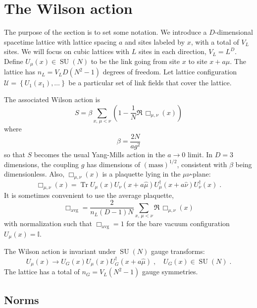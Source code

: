 \documentclass[preprint,aps,prd]{revtex4-2}
\newcommand{\da}{\dagger}  %
\newcommand{\be}{\begin{equation}}
\newcommand{\eq}{\end{equation}}
\newcommand{\plaquette}{\Box}
\newcommand{\config}{\mathcal{U}}
\DeclareMathOperator{\SU}{SU}
\DeclareMathOperator{\Tr}{Tr}
\begin{document}
\section{The Wilson action}

The purpose of the section is to set some notation.
We introduce a $D$-dimensional spacetime lattice with lattice
spacing $a$ and sites labeled by $x$, with a total of $V_L$ sites.
We will focus on cubic lattices with $L$ sites in each direction,
$V_L = L^D$.
Define $U_\mu(x) \in \SU(N)$ to be the link going from site $x$ to
site $x+a \hat{\mu}$.
The lattice has $n_L=V_L D \left(N^2-1\right)$ degrees of freedom.
Let lattice configuration
$\config=\left\{U_1(x_1),\ldots\right\}$
be a particular set of link fields that cover the lattice.

The associated Wilson action is
%
\be
S = \beta \sum_{x,\, \mu<\nu} \left(1-\frac{1}{N} \Re\, \plaquette_{\mu,\nu}(x)\right) \label{action}
\eq
where
\be
\beta=\frac{2 N}{a g^2}
\eq
so that $S$ becomes the usual Yang-Mills action in the $a\to 0$ limit.
In $D=3$ dimensions, the coupling $g$ has dimensions of
$\left(\mbox{mass}\right)^{1/2}$, consistent with $\beta$ being dimensionless.
Also, $\plaquette_{\mu,\nu}(x)$ is a plaquette lying in the $\mu\nu$-plane:
\be
\plaquette_{\mu,\nu}(x) = \Tr U_\mu(x) U_\nu(x+a \hat{\mu})
U_\mu^\da(x+a\hat{\nu}) U_\nu^\da(x) \; .
\eq
It is sometimes convenient to use the average plaquette,
\be
      \plaquette_\mathrm{avg} = \frac{2}{n_L (D-1) N}
             \sum_{x,\,\mu<\nu} \Re\,\plaquette_{\mu,\nu}(x) 
\eq
with normalization such that $\plaquette_\mathrm{avg}=1$
for the bare vacuum configuration $U_\mu(x) = \mathbb{I}$.

The Wilson action is invariant under $\SU(N)$ gauge transforms:
%
\be
    U_\mu(x) \to U_G(x) U_\mu(x) U_G^\da(x+a \hat{\mu})
         \; , \quad U_G(x) \in \SU(N) \; .
\eq
%
The lattice has a total of $n_G = V_L\left(N^2-1\right)$ gauge symmetries.

\subsection{Norms}
\end{document}

